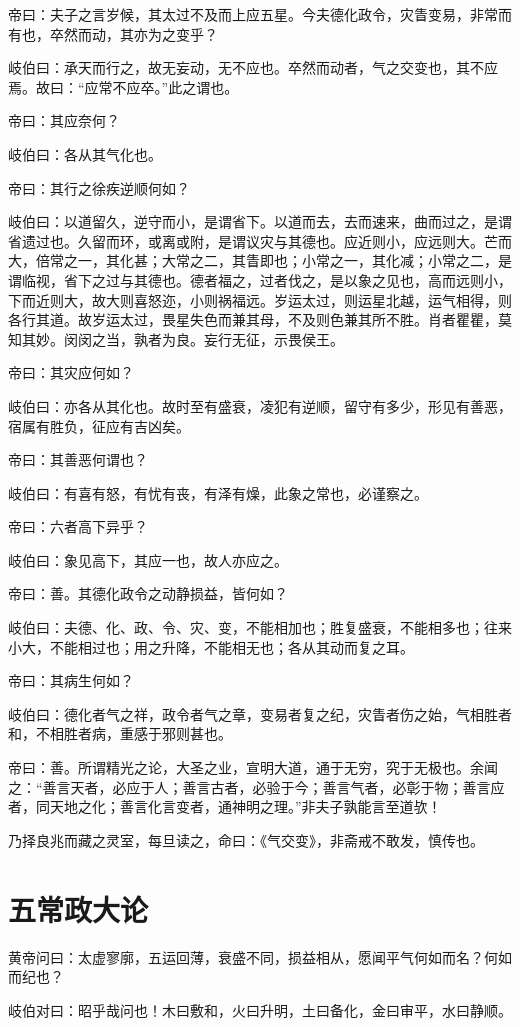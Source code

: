 \documentclass{article}%
\begin{document}
帝曰：夫子之言岁候，其太过不及而上应五星。今夫德化政令，灾眚变易，非常而有也，卒然而动，其亦为之变乎？

岐伯曰：承天而行之，故无妄动，无不应也。卒然而动者，气之交变也，其不应焉。故曰：“应常不应卒。”此之谓也。

帝曰：其应奈何？

岐伯曰：各从其气化也。

帝曰：其行之徐疾逆顺何如？

岐伯曰：以道留久，逆守而小，是谓省下。以道而去，去而速来，曲而过之，是谓省遗过也。久留而环，或离或附，是谓议灾与其德也。应近则小，应远则大。芒而大，倍常之一，其化甚；大常之二，其眚即也；小常之一，其化减；小常之二，是谓临视，省下之过与其德也。德者福之，过者伐之，是以象之见也，高而远则小，下而近则大，故大则喜怒迩，小则祸福远。岁运太过，则运星北越，运气相得，则各行其道。故岁运太过，畏星失色而兼其母，不及则色兼其所不胜。肖者瞿瞿，莫知其妙。闵闵之当，孰者为良。妄行无征，示畏侯王。

帝曰：其灾应何如？

岐伯曰：亦各从其化也。故时至有盛衰，凌犯有逆顺，留守有多少，形见有善恶，宿属有胜负，征应有吉凶矣。

帝曰：其善恶何谓也？

岐伯曰：有喜有怒，有忧有丧，有泽有燥，此象之常也，必谨察之。

帝曰：六者高下异乎？

岐伯曰：象见高下，其应一也，故人亦应之。

帝曰：善。其德化政令之动静损益，皆何如？

岐伯曰：夫德、化、政、令、灾、变，不能相加也；胜复盛衰，不能相多也；往来小大，不能相过也；用之升降，不能相无也；各从其动而复之耳。

帝曰：其病生何如？

岐伯曰：德化者气之祥，政令者气之章，变易者复之纪，灾眚者伤之始，气相胜者和，不相胜者病，重感于邪则甚也。

帝曰：善。所谓精光之论，大圣之业，宣明大道，通于无穷，究于无极也。余闻之：“善言天者，必应于人；善言古者，必验于今；善言气者，必彰于物；善言应者，同天地之化；善言化言变者，通神明之理。”非夫子孰能言至道欤！

乃择良兆而藏之灵室，每旦读之，命曰：《气交变》，非斋戒不敢发，慎传也。
\section{五常政大论}
黄帝问曰：太虚寥廓，五运回薄，衰盛不同，损益相从，愿闻平气何如而名？何如而纪也？

岐伯对曰：昭乎哉问也！木曰敷和，火曰升明，土曰备化，金曰审平，水曰静顺。
\end{document}
